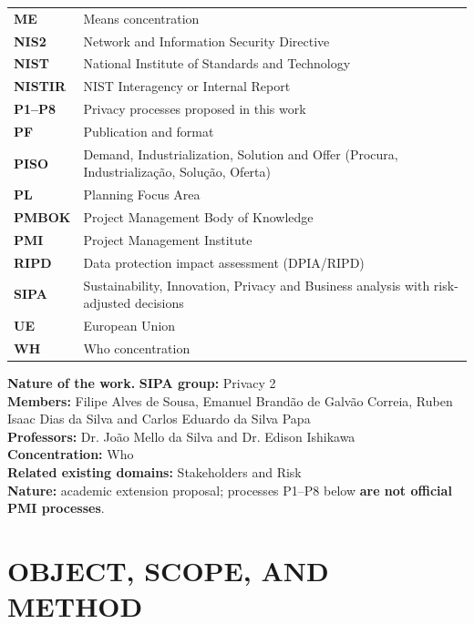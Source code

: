 \documentclass[12pt,a4paper,article,oneside,brazil,english]{abntex2}
\begin{document}
\begin{longtable}{@{}>{\raggedright\arraybackslash}p{2.6cm}>{\raggedright\arraybackslash}p{\dimexpr\linewidth-2.6cm-2\tabcolsep\relax}@{}}
\textbf{ME} & Means concentration\\[2pt]
\textbf{NIS2} & Network and Information Security Directive\\[2pt]
\textbf{NIST} & National Institute of Standards and Technology\\[2pt]
\textbf{NISTIR} & NIST Interagency or Internal Report\\[2pt]
\textbf{P1--P8} & Privacy processes proposed in this work\\[2pt]
\textbf{PF} & Publication and format\\[2pt]
\textbf{PISO} & Demand, Industrialization, Solution and Offer (Procura, Industrialização, Solução, Oferta)\\[2pt]
\textbf{PL} & Planning Focus Area\\[2pt]
\textbf{PMBOK} & Project Management Body of Knowledge\\[2pt]
\textbf{PMI} & Project Management Institute\\[2pt]
\textbf{RIPD} & Data protection impact assessment (DPIA/RIPD)\\[2pt]
\textbf{SIPA} & Sustainability, Innovation, Privacy and Business analysis with risk-adjusted decisions\\[2pt]
\textbf{UE} & European Union\\[2pt]
\textbf{WH} & Who concentration\\[2pt]
\end{longtable}
\endgroup
\clearpage

\begin{flushleft}\small\SingleSpacing
\noindent\textbf{Nature of the work.} \textbf{SIPA group:} Privacy 2\\ \textbf{Members:} Filipe Alves de Sousa, Emanuel Brandão de Galvão Correia, Ruben Isaac Dias da Silva and Carlos Eduardo da Silva Papa\\ \textbf{Professors:} Dr. João Mello da Silva and Dr. Edison Ishikawa\\ \textbf{Concentration:} Who\\ \textbf{Related existing domains:} Stakeholders and Risk\\ \textbf{Nature:} academic extension proposal; processes P1–P8 below \textbf{are not official PMI processes}.
\end{flushleft}
\vspace{\onelineskip}

\section{OBJECT, SCOPE, AND METHOD}
\end{document}
